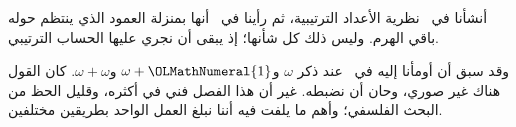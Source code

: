 \documentclass[../../../include/open-logic-section]{subfiles}
\begin{document}


أنشأنا في~ نظرية الأعداد الترتيبية، ثم رأينا
في~ أنها بمنزلة العمود الذي ينتظم حوله باقي
الهرم. وليس ذلك كل شأنها؛ إذ يبقى أن نجري عليها الحساب الترتيبي.

وقد سبق أن أومأنا إليه في~ عند ذكر
$\omega$ و$\omega+{\OLMathNumeral{1}}$ و$\omega+\omega$. كان القول هناك غير صوري،
وحان أن نضبطه. غير أن هذا الفصل فني في أكثره، وقليل الحظ من البحث
الفلسفي؛ وأهم ما يلفت فيه أننا نبلغ العمل الواحد بطريقين مختلفين.
\end{document}
